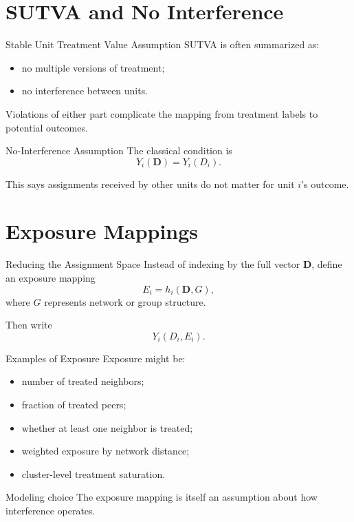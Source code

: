 \documentclass[aspectratio=169,11pt]{beamer}
\begin{document}
\section{SUTVA and No Interference}

\begin{frame}{Stable Unit Treatment Value Assumption}
SUTVA is often summarized as:
\begin{itemize}
\item no multiple versions of treatment;
\item no interference between units.
\end{itemize}

Violations of either part complicate the mapping from treatment labels to potential outcomes.
\end{frame}

\begin{frame}{No-Interference Assumption}
The classical condition is
\[
Y_i(\mathbf D)=Y_i(D_i).
\]

This says assignments received by other units do not matter for unit \(i\)'s outcome.
\end{frame}

\section{Exposure Mappings}

\begin{frame}{Reducing the Assignment Space}
Instead of indexing by the full vector \(\mathbf D\), define an exposure mapping
\[
E_i = h_i(\mathbf D, G),
\]
where \(G\) represents network or group structure.

Then write
\[
Y_i(D_i,E_i).
\]
\end{frame}

\begin{frame}{Examples of Exposure}
Exposure might be:
\begin{itemize}
\item number of treated neighbors;
\item fraction of treated peers;
\item whether at least one neighbor is treated;
\item weighted exposure by network distance;
\item cluster-level treatment saturation.
\end{itemize}
\end{frame}

\begin{alertblock}{Modeling choice}
The exposure mapping is itself an assumption about how interference operates.
\end{alertblock}
\end{document}
